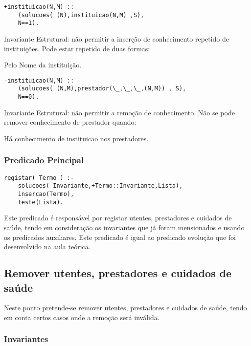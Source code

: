 \documentclass[a4paper]{report} %
\begin{document}
\begin{verbatim}
+instituicao(N,M) :: 
    (solucoes( (N),instituicao(N,M) ,S),
    N==1).
\end{verbatim}

Invariante Estrutural: não permitir a inserção de conhecimento repetido de instituições. Pode estar repetido de duas formas:
\begin{arrowlist}
\item Pelo Nome da instituição.
\end{arrowlist}

\begin{verbatim}
-instituicao(N,M) :: 
    (solucoes( (N,M),prestador(\_,\_,\_,(N,M)) , S), 
    N==0).
\end{verbatim}

Invariante Estrutural: não permitir a remoção de conhecimento. Não se pode remover conhecimento de prestador quando:
\begin{arrowlist}
\item Há conhecimento de instituicao nos prestadores.
\end{arrowlist}

\subsubsection{Predicado Principal}

\begin{verbatim}
registar( Termo ) :-
    solucoes( Invariante,+Termo::Invariante,Lista), 
    insercao(Termo), 
    teste(Lista).
\end{verbatim}

Este predicado é responsável por registar utentes, prestadores e cuidados de saúde, tendo em consideração os invariantes que já foram mensionados e usando os predicados auxiliares. Este predicado é igual ao predicado evolução que foi desenvolvido na aula teórica.

\subsection{ Remover utentes, prestadores e cuidados de saúde}
Neste ponto pretende-se remover utentes, prestadores e cuidados de saúde, tendo em conta certos casos onde a remoção será inválida.
\par

\subsubsection{Invariantes}
\end{document}
